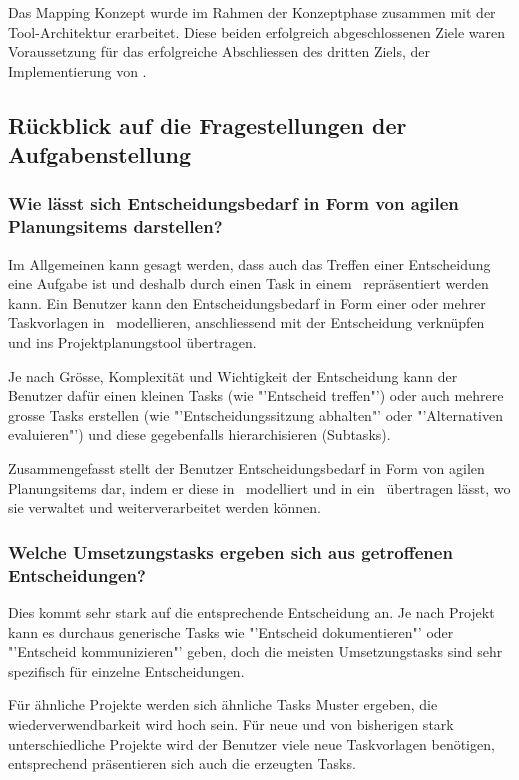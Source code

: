 		Das Mapping Konzept wurde im Rahmen der Konzeptphase zusammen mit der Tool-Architektur erarbeitet. 
		Diese beiden erfolgreich abgeschlossenen Ziele waren Voraussetzung für das erfolgreiche Abschliessen des dritten Ziels, 
		der Implementierung von \eeppi.
				
		
	
	\subsection{Rückblick auf die Fragestellungen der Aufgabenstellung}
		\subsubsection{Wie lässt sich Entscheidungsbedarf in Form von agilen Planungsitems darstellen?}
			Im Allgemeinen kann gesagt werden,
			dass auch das Treffen einer Entscheidung eine Aufgabe ist
			und deshalb durch einen Task in einem \ppt\ repräsentiert werden kann.
			Ein Benutzer kann den Entscheidungsbedarf in Form einer oder mehrer Taskvorlagen in \eeppi\ modellieren,  
			anschliessend mit der Entscheidung verknüpfen und ins Projektplanungstool übertragen.
			
			Je nach Grösse, Komplexität und Wichtigkeit der Entscheidung kann der Benutzer dafür einen kleinen Tasks (wie "'Entscheid treffen"') oder auch mehrere grosse Tasks erstellen (wie "'Entscheidungssitzung abhalten"' oder "'Alternativen evaluieren"') und diese gegebenfalls hierarchisieren (Subtasks).			
			
			Zusammengefasst stellt der Benutzer Entscheidungsbedarf in Form von agilen Planungsitems dar, indem er diese in \eeppi\ modelliert und in ein \ppt\ übertragen lässt, wo sie verwaltet und weiterverarbeitet werden können.


		\subsubsection{Welche Umsetzungstasks ergeben sich aus getroffenen Entscheidungen?}
			Dies kommt sehr stark auf die entsprechende Entscheidung an.
			Je nach Projekt kann es durchaus generische Tasks wie "'Entscheid dokumentieren"' oder "'Entscheid kommunizieren"' geben,
			doch die meisten Umsetzungstasks sind sehr spezifisch für einzelne Entscheidungen.
			
			Für ähnliche Projekte werden sich ähnliche Tasks Muster ergeben, die wiederverwendbarkeit wird hoch sein.
			Für neue und von bisherigen stark unterschiedliche Projekte wird der Benutzer viele neue Taskvorlagen benötigen, 
			entsprechend präsentieren sich auch die erzeugten Tasks.
			
